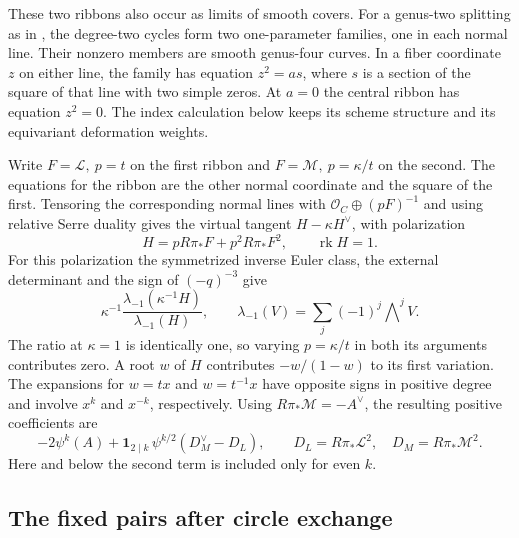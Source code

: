 These two ribbons also occur as limits of smooth covers. For a
genus-two splitting as in \cite[Proposition~8.1]{wuebben-geometric},
the degree-two cycles form two one-parameter families, one in each
normal line. Their nonzero members are smooth genus-four curves.
In a fiber coordinate \(z\) on either line, the family has equation
\(z^2=a s\), where \(s\) is a section of the square of that line
with two simple zeros. At \(a=0\) the central ribbon has equation
\(z^2=0\). The index calculation below keeps its scheme structure
and its equivariant deformation weights.

Write \(F=\mathcal L,\ p=t\) on the first ribbon and
\(F=\mathcal M,\ p=\kappa/t\) on the second. The equations for the
ribbon are the other normal coordinate and the square of the first.
Tensoring the corresponding normal lines with
\(\mathcal O_C\oplus(pF)^{-1}\) and using relative Serre duality gives
the virtual tangent \(H-\kappa H^\vee\), with polarization
\[
 H=p R\pi_*F+p^2 R\pi_*F^2,\qquad \operatorname{rk}H=1 .
\]
For this polarization the symmetrized inverse Euler class, the
external determinant and the sign of \((-q)^{-3}\) give
\[
 \kappa^{-1}
 \frac{\lambda_{-1}(\kappa^{-1}H)}{\lambda_{-1}(H)} ,
 \qquad
 \lambda_{-1}(V)=\sum_j(-1)^j\mathop{\bigwedge}\nolimits^j V .
\]
The ratio at \(\kappa=1\) is identically one, so varying \(p=\kappa/t\)
in both its arguments contributes zero. A root \(w\) of \(H\)
contributes \(-w/(1-w)\) to its first variation. The expansions for
\(w=tx\) and \(w=t^{-1}x\) have opposite signs in positive degree
and involve \(x^k\) and \(x^{-k}\), respectively. Using
\(R\pi_*\mathcal M=-A^\vee\), the resulting positive coefficients are
\begin{equation}
 -2\psi^k(A)+\mathbf1_{2\mid k}\,
       \psi^{k/2}(D_M^\vee-D_L),\qquad
 D_L=R\pi_*\mathcal L^2,\quad D_M=R\pi_*\mathcal M^2 .
 \label{eq:circle-unsimplified-edge}
\end{equation}
Here and below the second term is included only for even \(k\).

\subsection{The fixed pairs after circle exchange}

